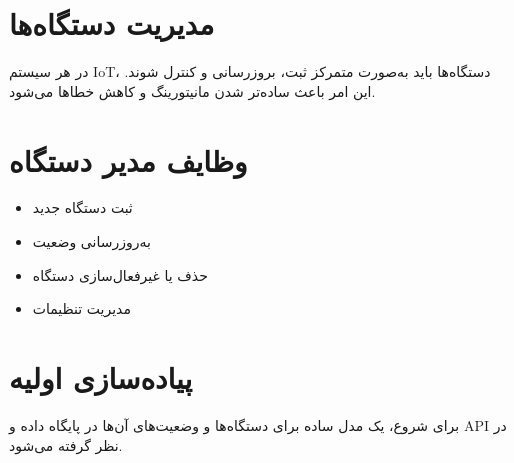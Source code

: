 \section{مدیریت دستگاه‌ها}

در هر سیستم IoT، دستگاه‌ها باید به‌صورت متمرکز ثبت، بروزرسانی و کنترل شوند. این امر باعث ساده‌تر شدن مانیتورینگ و کاهش خطاها می‌شود.

\section{وظایف مدیر دستگاه}

\begin{itemize}
    \item ثبت دستگاه جدید
    \item به‌روزرسانی وضعیت
    \item حذف یا غیرفعال‌سازی دستگاه
    \item مدیریت تنظیمات
\end{itemize}

\section{پیاده‌سازی اولیه}

برای شروع، یک مدل ساده برای دستگاه‌ها و وضعیت‌های آن‌ها در پایگاه داده و API در نظر گرفته می‌شود.
